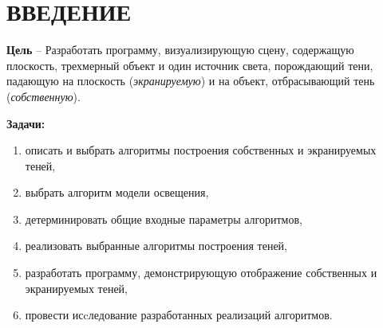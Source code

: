 \chapter*{ВВЕДЕНИЕ}

\textbf{Цель} -- Разработать программу, визуализирующую сцену, содержащую плоскость,
трехмерный объект и один источник света, порождающий тени, падающую на плоскость (\textit{экранируемую}) и
на объект, отбрасывающий тень (\textit{собственную}).

\textbf{Задачи:}

\begin{enumerate}[label=\arabic*), labelsep=0.5em]
    \item описать и выбрать алгоритмы построения собственных и экранируемых теней,
    \item выбрать алгоритм модели освещения,
    \item детерминировать общие входные параметры алгоритмов,
    \item реализовать выбранные алгоритмы построения теней,
    \item разработать программу, демонстрирующую отображение собственных и экранируемых теней,
    \item провести исcледование разработанных реализаций алгоритмов.
\end{enumerate}